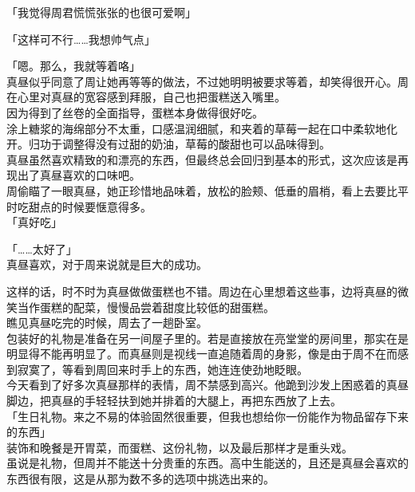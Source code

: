 「我觉得周君慌慌张张的也很可爱啊」

「这样可不行……我想帅气点」

「嗯。那么，我就等着咯」\\

真昼似乎同意了周让她再等等的做法，不过她明明被要求等着，却笑得很开心。周在心里对真昼的宽容感到拜服，自己也把蛋糕送入嘴里。\\

因为得到了丝卷的全面指导，蛋糕本身做得很好吃。\\

涂上糖浆的海绵部分不太重，口感温润细腻，和夹着的草莓一起在口中柔软地化开。归功于调整得没有过甜的奶油，草莓的酸甜也可以品味得到。\\

真昼虽然喜欢精致的和漂亮的东西，但最终总会回归到基本的形式，这次应该是再现出了真昼喜欢的口味吧。\\

周偷瞄了一眼真昼，她正珍惜地品味着，放松的脸颊、低垂的眉梢，看上去要比平时吃甜点的时候要惬意得多。\\

「真好吃」

「……太好了」\\

真昼喜欢，对于周来说就是巨大的成功。

这样的话，时不时为真昼做做蛋糕也不错。周边在心里想着这些事，边将真昼的微笑当作蛋糕的配菜，慢慢品尝着甜度比较低的甜蛋糕。\\

瞧见真昼吃完的时候，周去了一趟卧室。\\

包装好的礼物是准备在另一间屋子里的。若是直接放在亮堂堂的房间里，那实在是明显得不能再明显了。而真昼则是视线一直追随着周的身影，像是由于周不在而感到寂寞了，等看到周回来时手上的东西，她连连使劲地眨眼。\\

今天看到了好多次真昼那样的表情，周不禁感到高兴。他跪到沙发上困惑着的真昼脚边，把真昼的手轻轻扶到她并排着的大腿上，再把东西放了上去。\\

「生日礼物。来之不易的体验固然很重要，但我也想给你一份能作为物品留存下来的东西」\\

装饰和晚餐是开胃菜，而蛋糕、这份礼物，以及最后那样才是重头戏。\\

虽说是礼物，但周并不能送十分贵重的东西。高中生能送的，且还是真昼会喜欢的东西很有限，这是从那为数不多的选项中挑选出来的。\\

